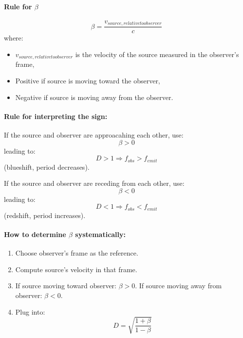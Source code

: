 \documentclass[a4paper]{article}
\theoremstyle{plain}
\theoremstyle{definition}
\begin{document}
\paragraph{Rule for $\beta$}

\begin{equation}
\beta = \frac{v_{source,relative to observer}}{c}
\end{equation}
where:
\begin{itemize}
\item $v_{source,relative to observer}$ is the velocity of the source measured in the observer's frame,
\item Positive if source is moving toward the observer,
\item Negative if source is moving away from the observer.
\end{itemize}

\paragraph{Rule for interpreting the sign:}

If the source and observer are approacahing each other, use:
\begin{equation}
\beta > 0
\end{equation}
leading to:
\begin{equation}
D > 1 \Rightarrow f_{obs} > f_{emit}
\end{equation}
(blueshift, period decreases).

If the source and observer are receding from each other, use:
\begin{equation}
\beta < 0
\end{equation}
leading to:
\begin{equation}
D < 1 \Rightarrow f_{obs} < f_{emit}
\end{equation}
(redshift, period increases).

\paragraph{How to determine $\beta$ systematically:}

\begin{enumerate}
\item Choose observer's frame as the reference.
\item Compute source's velocity in that frame.
\item If source moving toward observer: $\beta > 0$.  If source moving away from observer: $\beta < 0$.
\item Plug into:
\begin{equation}
D = \sqrt{ \frac{1+\beta}{1-\beta} }
\end{equation}
\end{enumerate}
\end{document}
